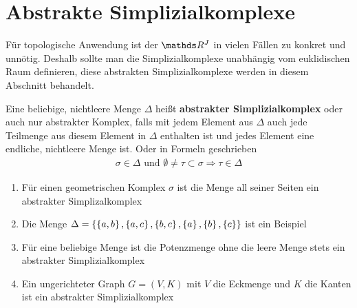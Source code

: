 
\section{Abstrakte Simplizialkomplexe}

Für topologische Anwendung ist der $\R^J$ in vielen Fällen zu konkret und 
unnötig. Deshalb sollte man die Simplizialkomplexe unabhängig vom 
euklidischen Raum definieren, diese abstrakten Simplizialkomplexe 
werden in diesem Abschnitt behandelt.

\begin{Def}
	Eine beliebige, nichtleere Menge $\Delta$ heißt \textbf{abstrakter Simplizialkomplex} oder auch nur abstrakter Komplex,
	falls mit jedem Element aus $\Delta$ auch jede Teilmenge aus diesem Element in $\Delta$
	enthalten ist und jedes Element eine endliche, nichtleere Menge ist. Oder in Formeln geschrieben
	\begin{gather*}
		\sigma \in \Delta \text{ und } \emptyset \neq \tau \subset \sigma \Rightarrow \tau \in \Delta
	\end{gather*}
\end{Def}

\begin{Bsp}
	\begin{enumerate}[\textbullet]
		\item Für einen geometrischen Komplex $\sigma$ ist die Menge
			all seiner Seiten ein abstrakter Simplizalkomplex
		\item Die Menge $\Delta = \sset{%
			 \sset{a,b},\sset{a,c},%
			 \sset{b,c},\sset{a},\sset{b},\sset{c}}$ ist ein Beispiel
		\item Für eine beliebige Menge ist die Potenzmenge ohne die leere Menge stets ein abstrakter
			Simplizialkomplex
		\item Ein ungerichteter Graph $G=(V,K)$ mit $V$ die Eckmenge und $K$ die Kanten ist ein abstrakter Simplizialkomplex
	\end{enumerate}
\end{Bsp}






